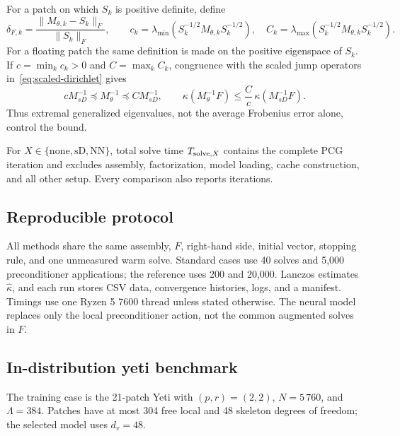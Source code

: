 \documentclass{article}
\newcommand{\Sloc}[1]{S_{#1}}                    %
\newcommand{\Fschur}{F}                           %
\newcommand{\Psd}{M_{sD}^{-1}}                   %
\newcommand{\Pneural}{M_{\theta}^{-1}}            %
\newcommand{\dv}{d_v}                             %
\theoremstyle{plain}
\numberwithin{equation}{section}
\begin{document}
For a patch on which $\Sloc{k}$ is positive definite, define
\begin{equation}
    \delta_{F,k}=\frac{\|M_{\theta,k}-\Sloc{k}\|_F}{\|\Sloc{k}\|_F},\qquad
    c_k=\lambda_{\min}\!\left(\Sloc{k}^{-1/2}M_{\theta,k}\Sloc{k}^{-1/2}\right),
    \quad
    C_k=\lambda_{\max}\!\left(\Sloc{k}^{-1/2}M_{\theta,k}\Sloc{k}^{-1/2}\right).
    \label{eq:nn-local-diagnostics}
\end{equation}
For a floating patch the same definition is made on the positive eigenspace
of $\Sloc{k}$.  If $c=\min_k c_k>0$ and $C=\max_k C_k$, congruence with the
scaled jump operators in~\eqref{eq:scaled-dirichlet} gives
\begin{equation}
    c\Psd\preceq\Pneural\preceq C\Psd,
    \qquad
    \kappa(\Pneural\Fschur)
    \leq \frac{C}{c}\,\kappa(\Psd\Fschur).
    \label{eq:nn-global-bound}
\end{equation}
Thus extremal generalized eigenvalues, not the average Frobenius error alone,
control the bound.

For $X\in\{\mathrm{none},\mathrm{sD},\mathrm{NN}\}$, total solve time
$T_{{\rm solve},X}$ contains the complete PCG iteration and excludes assembly,
factorization, model loading, cache construction, and all other setup.  Every
comparison also reports iterations.

\subsection{Reproducible protocol}

All methods share the same assembly, $\Fschur$, right-hand side, initial
vector, stopping rule, and one unmeasured warm solve.  Standard cases use 40
solves and 5,000 preconditioner applications; the reference uses 200 and
20,000.  Lanczos estimates $\widehat\kappa$, and each run stores CSV data,
convergence histories, logs, and a manifest.  Timings use one Ryzen 5 7600
thread unless stated otherwise.  The neural model replaces only the local
preconditioner action, not the common augmented solves in $\Fschur$.

\subsection{In-distribution yeti benchmark}

The training case is the 21-patch Yeti with $(p,r)=(2,2)$, $N=5\,760$, and
$\Lambda=384$.  Patches have at most 304 free local and 48 skeleton degrees of
freedom; the selected model uses $\dv=48$.
\end{document}
